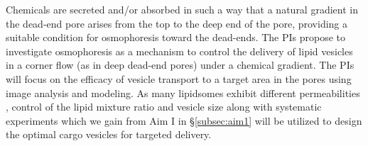 \documentclass[11pt]{article}
\begin{document}
Chemicals are secreted and/or absorbed in such a way that a natural gradient in the dead-end pore arises from the top to the deep end of the pore, 
providing a suitable condition for osmophoresis toward the dead-ends. 
The PIs propose to investigate osmophoresis as a mechanism to control the delivery of lipid vesicles in a corner flow (as in deep dead-end pores) under a 
chemical gradient. 
%
The PIs will focus on the efficacy of vesicle transport to a target area in the pores using image analysis and modeling. 
As many lipidsomes exhibit different permeabilities \cite{fettiplace1980,olbrich2000},
control of the lipid mixture ratio and vesicle size along with systematic experiments which we gain 
from Aim I in \S\ref{subsec:aim1} will be utilized to design the optimal cargo vesicles for targeted delivery. 



\vspace*{-7pt}
\end{document}
